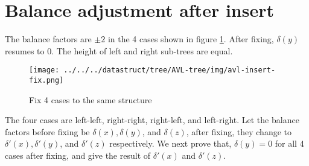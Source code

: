 \documentclass[b5paper]{article}
\begin{document}
\section{Balance adjustment after insert}

The balance factors are $\pm 2$ in the 4 cases shown in figure \ref{fig:avl-insert-fix-appendix}. After fixing, $\delta(y)$ resumes
to 0. The height of left and right sub-trees are equal.

\begin{figure}[htbp]
  \centering
  \texttt{[image: ../../../datastruct/tree/AVL-tree/img/avl-insert-fix.png]}
  \caption{Fix 4 cases to the same structure}
  \label{fig:avl-insert-fix-appendix}
\end{figure}

The four cases are left-left, right-right, right-left, and left-right. Let the balance factors before fixing be $\delta(x), \delta(y)$, and $\delta(z)$, after fixing, they change to $\delta'(x), \delta'(y)$, and $\delta'(z)$ respectively. We next prove that, $\delta(y)=0$ for all 4 cases after fixing, and give the result of $\delta'(x)$ and $\delta'(z)$.
\end{document}
